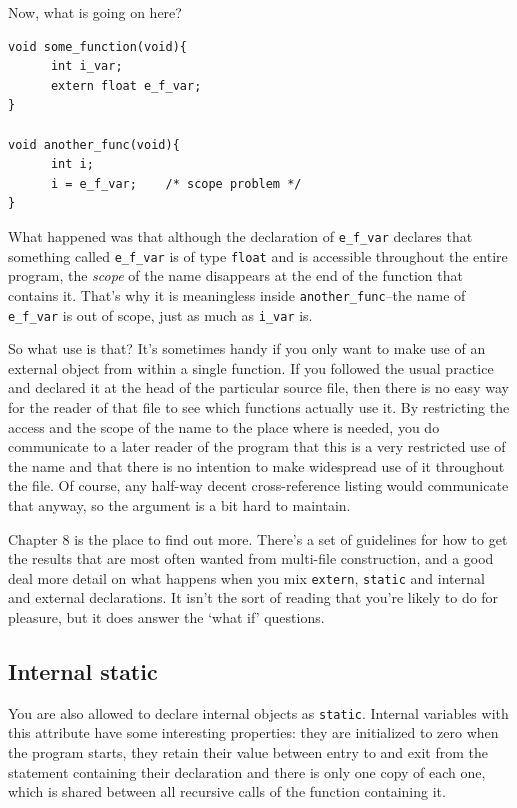    Now, what is going on here?

\begin{Verbatim}
void some_function(void){
      int i_var;
      extern float e_f_var;
}

void another_func(void){
      int i;
      i = e_f_var;    /* scope problem */
}
\end{Verbatim}

   What happened was that although the declaration of
    \texttt{e\_f\_var} declares that something called \texttt{e\_f\_var}
    is of type \texttt{float} and is accessible throughout the entire
    program, the \textit{scope} of the name disappears at the end of the
    function that contains it. That's why it is meaningless inside
    \texttt{another\_func}--the name of \texttt{e\_f\_var} is out
    of scope, just as much as \texttt{i\_var} is.


   So what use is that? It's sometimes handy if you only want to make use
    of an external object from within a single function. If you followed the
    usual practice and declared it at the head of the particular source
    file, then there is no easy way for the reader of that file to see which
    functions actually use it. By restricting the access and the scope of
    the name to the place where is needed, you do communicate to a later
    reader of the program that this is a very restricted use of the name and
    that there is no intention to make widespread use of it throughout the
    file. Of course, any half-way decent cross-reference listing would
    communicate that anyway, so the argument is a bit hard to maintain.


   Chapter 8 is the place to find out more. There's a set of
    guidelines for how to get the results that are most often wanted from
    multi-file construction, and a good deal more detail on what happens
    when you mix \texttt{extern}, \texttt{static} and internal and
    external declarations. It isn't the sort of reading that you're likely
    to do for pleasure, but it does answer the `what if'
    questions.

  

  \subsection{Internal static}
   

   You are also allowed to declare internal objects as
    \texttt{static}. Internal variables with this attribute have some
    interesting properties: they are initialized to zero when the program
    starts, they retain their value between entry to and exit from the
    statement containing their declaration and there is only one copy of
    each one, which is shared between all recursive calls of the function
    containing it.


